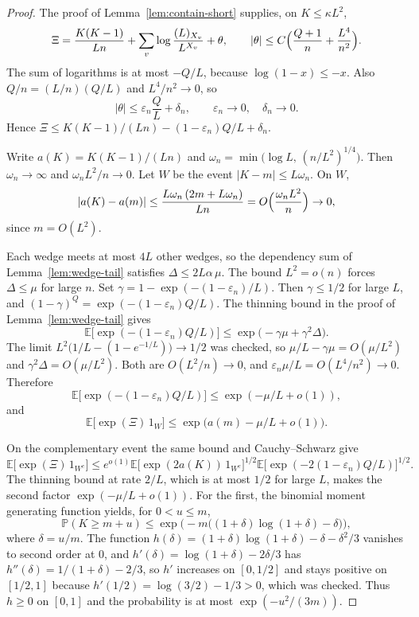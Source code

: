 \documentclass[11pt]{article}
\newcommand{\EE}{\mathbb{E}}
\newcommand{\PP}{\mathbb{P}}
\begin{document}
\begin{proof}
The proof of Lemma~\ref{lem:contain-short} supplies, on \(K\le\kappa L^2\),
\[
\Xi
=
\frac{K(K-1)}{Ln}+\sum_v\log\frac{(L)_{X_v}}{L^{X_v}}+\theta,
\qquad
|\theta|
\le
C\Bigl(\frac{Q+1}{n}+\frac{L^4}{n^2}\Bigr).
\]
The sum of logarithms is at most \(-Q/L\), because
\(\log(1-x)\le -x\). Also \(Q/n=(L/n)(Q/L)\) and \(L^4/n^2\to 0\), so
\[
|\theta|
\le
\varepsilon_n\frac{Q}{L}+\delta_n,
\qquad
\varepsilon_n\to 0,\quad\delta_n\to 0.
\]
Hence \(\Xi\le K(K-1)/(Ln)-(1-\varepsilon_n)Q/L+\delta_n\).

Write \(a(K)=K(K-1)/(Ln)\) and
\(\omega_n=\min\bigl(\log L,\,(n/L^2)^{1/4}\bigr)\).
Then \(\omega_n\to\infty\) and \(\omega_n L^2/n\to 0\).
Let \(W\) be the event \(|K-m|\le L\omega_n\).
On \(W\),
\[
|a(K)-a(m)|
\le
\frac{L\omega_n\,(2m+L\omega_n)}{Ln}
=
O\Bigl(\frac{\omega_n L^2}{n}\Bigr)
\to 0,
\]
since \(m=O(L^2)\).

Each wedge meets at most \(4L\) other wedges, so the dependency sum of
Lemma~\ref{lem:wedge-tail} satisfies \(\Delta\le 2L\alpha\,\mu\). The bound
\(L^2=o(n)\) forces \(\Delta\le\mu\) for large \(n\). Set
\(\gamma=1-\exp(-(1-\varepsilon_n)/L)\). Then \(\gamma\le 1/2\) for large \(L\),
and \((1-\gamma)^Q=\exp(-(1-\varepsilon_n)Q/L)\). The thinning bound in the proof
of Lemma~\ref{lem:wedge-tail} gives
\[
\EE\bigl[\exp(-(1-\varepsilon_n)Q/L)\bigr]
\le
\exp\bigl(-\gamma\mu+\gamma^2\Delta\bigr).
\]
The limit \(L^2\bigl(1/L-(1-e^{-1/L})\bigr)\to 1/2\) was checked, so
\(\mu/L-\gamma\mu=O(\mu/L^2)\) and \(\gamma^2\Delta=O(\mu/L^2)\). Both are
\(O(L^2/n)\to 0\), and \(\varepsilon_n\mu/L=O(L^4/n^2)\to 0\). Therefore
\[
\EE\bigl[\exp(-(1-\varepsilon_n)Q/L)\bigr]
\le
\exp(-\mu/L+o(1)),
\]
and
\[
\EE\bigl[\exp(\Xi)\,1_{W}\bigr]
\le
\exp\bigl(a(m)-\mu/L+o(1)\bigr).
\]

On the complementary event the same bound and Cauchy--Schwarz give
\[
\EE\bigl[\exp(\Xi)\,1_{W^c}\bigr]
\le
e^{o(1)}
\EE\bigl[\exp(2a(K))\,1_{W^c}\bigr]^{1/2}
\EE\bigl[\exp(-2(1-\varepsilon_n)Q/L)\bigr]^{1/2}.
\]
The thinning bound at rate \(2/L\), which is at most \(1/2\) for large \(L\),
makes the second factor \(\exp(-\mu/L+o(1))\). For the first, the binomial
moment generating function yields, for \(0<u\le m\),
\[
\PP(K\ge m+u)
\le
\exp\bigl(-m\bigl((1+\delta)\log(1+\delta)-\delta\bigr)\bigr),
\]
where \(\delta=u/m\). The function
\(h(\delta)=(1+\delta)\log(1+\delta)-\delta-\delta^2/3\) vanishes to second
order at \(0\), and \(h'(\delta)=\log(1+\delta)-2\delta/3\) has
\(h''(\delta)=1/(1+\delta)-2/3\), so \(h'\) increases on \([0,1/2]\) and stays
positive on \([1/2,1]\) because \(h'(1/2)=\log(3/2)-1/3>0\), which was checked. Thus \(h\ge 0\) on
\([0,1]\) and the probability is at most \(\exp(-u^2/(3m))\).


\end{proof}
\end{document}
